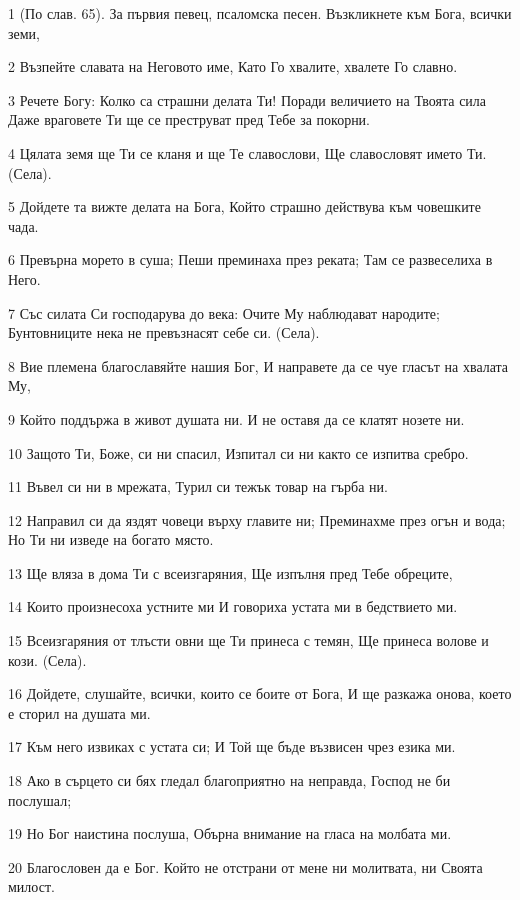 \par 1 (По слав. 65). За първия певец, псаломска песен. Възкликнете към Бога, всички земи,
\par 2 Възпейте славата на Неговото име, Като Го хвалите, хвалете Го славно.
\par 3 Речете Богу: Колко са страшни делата Ти! Поради величието на Твоята сила Даже враговете Ти ще се преструват пред Тебе за покорни.
\par 4 Цялата земя ще Ти се кланя и ще Те славослови, Ще славословят името Ти. (Села).
\par 5 Дойдете та вижте делата на Бога, Който страшно действува към човешките чада.
\par 6 Превърна морето в суша; Пеши преминаха през реката; Там се развеселиха в Него.
\par 7 Със силата Си господарува до века: Очите Му наблюдават народите; Бунтовниците нека не превъзнасят себе си. (Села).
\par 8 Вие племена благославяйте нашия Бог, И направете да се чуе гласът на хвалата Му,
\par 9 Който поддържа в живот душата ни. И не оставя да се клатят нозете ни.
\par 10 Защото Ти, Боже, си ни спасил, Изпитал си ни както се изпитва сребро.
\par 11 Въвел си ни в мрежата, Турил си тежък товар на гърба ни.
\par 12 Направил си да яздят човеци върху главите ни; Преминахме през огън и вода; Но Ти ни изведе на богато място.
\par 13 Ще вляза в дома Ти с всеизгаряния, Ще изпълня пред Тебе обреците,
\par 14 Които произнесоха устните ми И говориха устата ми в бедствието ми.
\par 15 Всеизгаряния от тлъсти овни ще Ти принеса с темян, Ще принеса волове и кози. (Села).
\par 16 Дойдете, слушайте, всички, които се боите от Бога, И ще разкажа онова, което е сторил на душата ми.
\par 17 Към него извиках с устата си; И Той ще бъде възвисен чрез езика ми.
\par 18 Ако в сърцето си бях гледал благоприятно на неправда, Господ не би послушал;
\par 19 Но Бог наистина послуша, Обърна внимание на гласа на молбата ми.
\par 20 Благословен да е Бог. Който не отстрани от мене ни молитвата, ни Своята милост.

